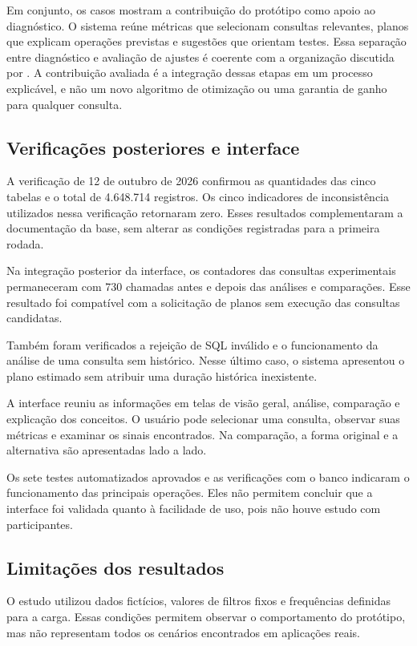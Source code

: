 \documentclass{UNESC}
\begin{document}
Em conjunto, os casos mostram a contribuição do protótipo como apoio ao diagnóstico. O sistema reúne métricas que selecionam consultas relevantes, planos que explicam operações previstas e sugestões que orientam testes. Essa separação entre diagnóstico e avaliação de ajustes é coerente com a organização discutida por . A contribuição avaliada é a integração dessas etapas em um processo explicável, e não um novo algoritmo de otimização ou uma garantia de ganho para qualquer consulta.

\subsection{Verificações posteriores e interface}

A verificação de 12 de outubro de 2026 confirmou as quantidades das cinco tabelas e o total de 4.648.714 registros. Os cinco indicadores de inconsistência utilizados nessa verificação retornaram zero. Esses resultados complementaram a documentação da base, sem alterar as condições registradas para a primeira rodada.

Na integração posterior da interface, os contadores das consultas experimentais permaneceram com 730 chamadas antes e depois das análises e comparações. Esse resultado foi compatível com a solicitação de planos sem execução das consultas candidatas.

Também foram verificados a rejeição de SQL inválido e o funcionamento da análise de uma consulta sem histórico. Nesse último caso, o sistema apresentou o plano estimado sem atribuir uma duração histórica inexistente.

A interface reuniu as informações em telas de visão geral, análise, comparação e explicação dos conceitos. O usuário pode selecionar uma consulta, observar suas métricas e examinar os sinais encontrados. Na comparação, a forma original e a alternativa são apresentadas lado a lado.

Os sete testes automatizados aprovados e as verificações com o banco indicaram o funcionamento das principais operações. Eles não permitem concluir que a interface foi validada quanto à facilidade de uso, pois não houve estudo com participantes.

\subsection{Limitações dos resultados}

O estudo utilizou dados fictícios, valores de filtros fixos e frequências definidas para a carga. Essas condições permitem observar o comportamento do protótipo, mas não representam todos os cenários encontrados em aplicações reais.
\end{document}
